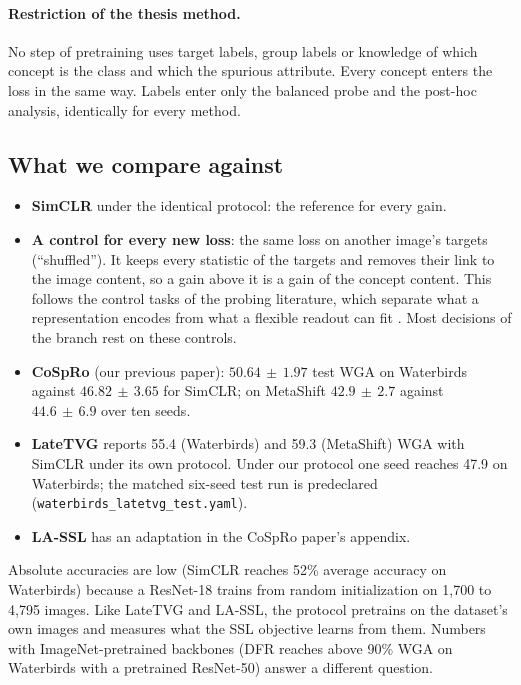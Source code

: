 \documentclass[11pt]{article}
\newcommand{\pmsd}[2]{$#1{\scriptstyle\,\pm\,#2}$}
\begin{document}
\paragraph{Restriction of the thesis method.} No step of pretraining uses target labels, group labels or
knowledge of which concept is the class and which the spurious attribute. Every concept enters the loss in
the same way. Labels enter only the balanced probe and the post-hoc analysis, identically for every method.

\subsection{What we compare against}
\begin{itemize}[leftmargin=*]
\item \textbf{SimCLR} \citep{chen2020simclr} under the identical protocol: the reference for every gain.
\item \textbf{A control for every new loss}: the same loss on another image's targets (``shuffled''). It
keeps every statistic of the targets and removes their link to the image content, so a gain above it is a
gain of the concept content. This follows the control tasks of the probing literature, which separate what
a representation encodes from what a flexible readout can fit \citep{hewitt2019control}. Most decisions of
the branch rest on these controls.
\item \textbf{CoSpRo} (our previous paper): \pmsd{50.64}{1.97} test WGA on Waterbirds against
\pmsd{46.82}{3.65} for SimCLR; on MetaShift \pmsd{42.9}{2.7} against \pmsd{44.6}{6.9} over ten seeds.
\item \textbf{LateTVG} \citep{hamidieh2024latetvg} reports 55.4 (Waterbirds) and 59.3 (MetaShift) WGA with
SimCLR under its own protocol. Under our protocol one seed reaches 47.9 on Waterbirds; the matched six-seed
test run is predeclared (\texttt{waterbirds\_latetvg\_test.yaml}).
\item \textbf{LA-SSL} \citep{zhu2023lassl} has an adaptation in the CoSpRo paper's appendix.
\end{itemize}
Absolute accuracies are low (SimCLR reaches 52\% average accuracy on Waterbirds) because a ResNet-18 trains
from random initialization on 1,700 to 4,795 images. Like LateTVG and LA-SSL, the protocol pretrains on the
dataset's own images and measures what the SSL objective learns from them. Numbers with ImageNet-pretrained
backbones (DFR reaches above 90\% WGA on Waterbirds with a pretrained ResNet-50) answer a different question.
\end{document}
